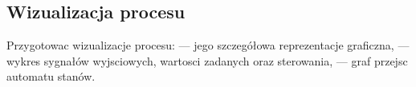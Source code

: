 \subsection{Wizualizacja procesu}
\label{lab:zad12}


%    

Przygotowac wizualizacje procesu:
— jego szczegółowa reprezentacje graficzna,
— wykres sygnałów wyjsciowych, wartosci zadanych oraz sterowania,
— graf przejsc automatu stanów.

\newpage
